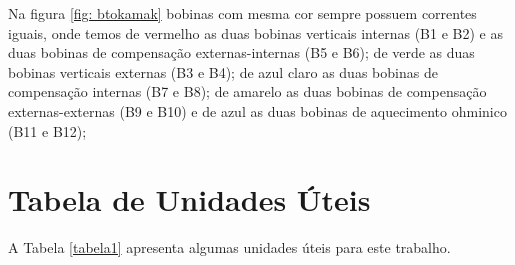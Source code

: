 \documentclass[12pt,oneside,a4paper]{abntex2}
\begin{document}
Na figura \ref{fig: btokamak} bobinas com mesma cor sempre possuem correntes iguais, onde temos de vermelho as duas bobinas verticais internas (B1 e B2) e as duas bobinas de compensação externas-internas (B5 e B6); de verde as duas bobinas verticais externas (B3 e B4); de azul claro as duas bobinas de compensação internas (B7 e B8); de amarelo as duas bobinas de compensação externas-externas (B9 e B10) e de azul as duas bobinas de aquecimento ohminico (B11 e B12);



\chapter{Tabela de Unidades Úteis}
A Tabela \ref{tabela1} apresenta algumas unidades úteis para este trabalho.
    
\end{document}
